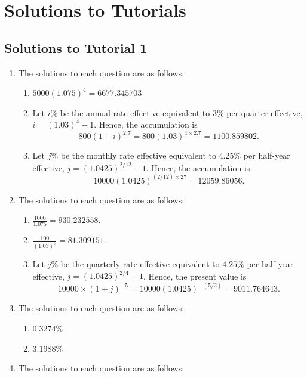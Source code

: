 \documentclass[
]{book}
\providecommand{\tightlist}{%
  \setlength{\itemsep}{0pt}\setlength{\parskip}{0pt}}
\theoremstyle{definition}
\theoremstyle{definition}
\theoremstyle{definition}
\theoremstyle{definition}
\theoremstyle{remark}
\begin{document}
\chapter{Solutions to Tutorials}\label{solutions-to-tutorials}

\section{Solutions to Tutorial 1}\label{solutions-to-tutorial-1}

\begin{enumerate}
\def\labelenumi{\arabic{enumi}.}
\item
  The solutions to each question are as follows:

  \begin{enumerate}
  \def\labelenumii{\arabic{enumii}.}
  \tightlist
  \item
    \(5000 (1.075)^4 = 6677.345703\)
  \item
    Let \(i\%\) be the annual rate effective equivalent to \(3\%\) per quarter-effective, \(i = (1.03)^4 - 1\).
    Hence, the accumulation is
    \[800(1+i)^{2.7} = 800(1.03)^{4\times2.7} = 1100.859802.\]
  \item
    Let \(j\%\) be the monthly rate effective equivalent to \(4.25\%\) per half-year effective, \(j = (1.0425)^{2/12} - 1\).
    Hence, the accumulation is
    \[10000(1.0425)^{(2/12)\times27} = 12059.86056.\]
  \end{enumerate}
\item
  The solutions to each question are as follows:

  \begin{enumerate}
  \def\labelenumii{\arabic{enumii}.}
  \tightlist
  \item
    \(\frac{1000}{1.075} = 930.232558\).
  \item
    \(\frac{100}{(1.03)^7} = 81.309151\).
  \item
    Let \(j\%\) be the quarterly rate effective equivalent to \(4.25\%\) per half-year effective, \(j = (1.0425)^{2/4} - 1\).
    Hence, the present value is
    \[10000\times (1+j)^{-5} = 10000(1.0425)^{-(5/2)} = 9011.764643.\]
  \end{enumerate}
\item
  The solutions to each question are as follows:

  \begin{enumerate}
  \def\labelenumii{\arabic{enumii}.}
  \tightlist
  \item
    0.3274\%
  \item
    3.1988\%
  \end{enumerate}
\item
  The solutions to each question are as follows:


\end{enumerate}
\end{document}
